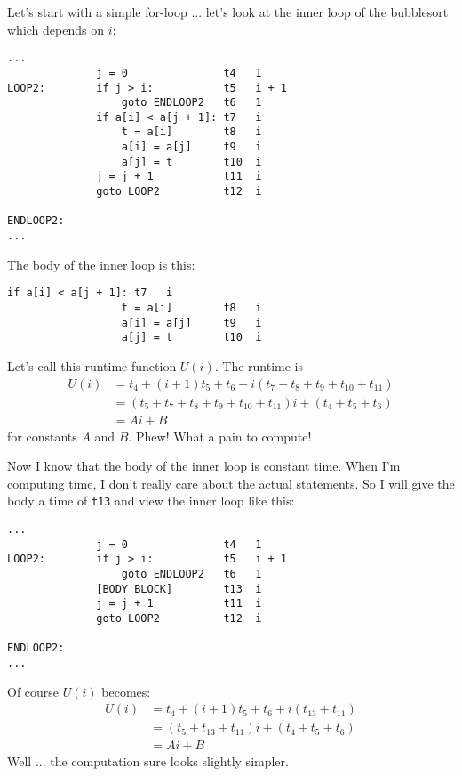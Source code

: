 Let's start with a simple for-loop ...
let's look at the inner loop of the bubblesort which depends on $i$:
\begin{Verbatim}[frame=single, fontsize=\footnotesize]
...
              j = 0               t4   1
LOOP2:        if j > i:           t5   i + 1
                  goto ENDLOOP2   t6   1
              if a[i] < a[j + 1]: t7   i
                  t = a[i]        t8   i
                  a[i] = a[j]     t9   i
                  a[j] = t        t10  i
              j = j + 1           t11  i
              goto LOOP2          t12  i

ENDLOOP2: 
...
\end{Verbatim}
The body of the inner loop is this:
\begin{Verbatim}[frame=single, fontsize=\footnotesize]
              if a[i] < a[j + 1]: t7   i
                  t = a[i]        t8   i
                  a[i] = a[j]     t9   i
                  a[j] = t        t10  i
\end{Verbatim}
Let's call this runtime function $U(i)$.
The runtime is
\begin{align*}
U(i) 
&= t_4 + (i + 1)t_5 + t_6 + i(t_7 + t_8 + t_9 + t_{10} + t_{11}) \\
&= (t_5 + t_7 + t_8 + t_9 + t_{10} + t_{11})i + (t_4 + t_5 + t_6) \\
&= Ai + B
\end{align*}
for constants $A$ and $B$. 
Phew! What a pain to compute!

Now I know that the body of the inner loop is constant time.
When I'm computing time, I don't really care about the actual
statements.
So I will give the body a time of 
\verb!t13! and view the inner loop like this:
\begin{Verbatim}[frame=single, fontsize=\footnotesize]
...
              j = 0               t4   1
LOOP2:        if j > i:           t5   i + 1
                  goto ENDLOOP2   t6   1
              [BODY BLOCK]        t13  i
              j = j + 1           t11  i
              goto LOOP2          t12  i

ENDLOOP2: 
...
\end{Verbatim}
Of course $U(i)$ becomes:
\begin{align*}
U(i) 
&= t_4 + (i + 1)t_5 + t_6 + i(t_{13} + t_{11}) \\
&= (t_5 + t_{13} + t_{11})i + (t_4 + t_5 + t_6) \\
&= Ai + B
\end{align*}
Well ... the computation sure looks slightly simpler.

